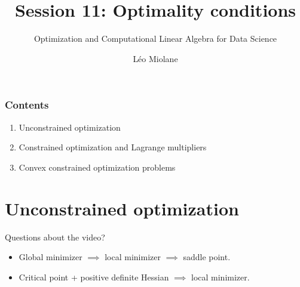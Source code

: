 \documentclass{beamer}
\title{Session 11: Optimality conditions}
\subtitle{Optimization and Computational Linear Algebra for Data Science}
\author{Léo Miolane}
\date{}
\begin{document}
\setcounter{showProgressBar}{0}
\setcounter{showSlideNumbers}{0}

\frame{\titlepage}
\setcounter{framenumber}{0}
\setcounter{showSlideNumbers}{1}

\begin{frame}
	\frametitle{Contents}
	\begin{enumerate}
		\item Unconstrained optimization
		\item Constrained optimization and Lagrange multipliers
		\item Convex constrained optimization problems
	\end{enumerate}
\end{frame}

\section{Unconstrained optimization}
\begin{frame}[t]{Questions about the video?}
	\grid

	\vspace{-0.2cm}
	\begin{itemize}
		\item Global minimizer $\implies$ local minimizer $\implies$ saddle point.
		\item Critical point + positive definite Hessian $\implies$ local minimizer.
	\end{itemize}

\end{frame}
\end{document}
